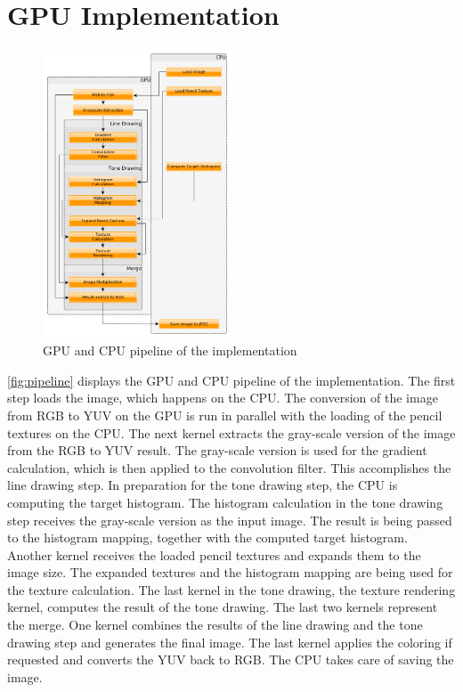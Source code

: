 \section{GPU Implementation} \label{gpu-implementation}

\begin{figure}[htb]
  \centering
  \includegraphics[width=0.5\textwidth]{images/pipeline.png}
  \caption{GPU and CPU pipeline of the implementation}
  \label{fig:pipeline}
\end{figure}

\autoref{fig:pipeline} displays the GPU and CPU pipeline of the implementation.
The first step loads the image, which happens on the CPU.  The conversion of
the image from RGB to YUV on the GPU is run in parallel with the loading of the
pencil textures on the CPU.  The next kernel extracts the gray-scale version of
the image from the RGB to YUV result.  The gray-scale version is used for the
gradient calculation, which is then applied to the convolution filter.  This
accomplishes the line drawing step.  In preparation for the tone drawing step,
the CPU is computing the target histogram.  The histogram calculation in the
tone drawing step receives the gray-scale version as the input image.  The
result is being passed to the histogram mapping, together with the computed
target histogram.  Another kernel receives the loaded pencil textures and
expands them to the image size.  The expanded textures and the histogram
mapping are being used for the texture calculation.  The last kernel in the
tone drawing, the texture rendering kernel, computes the result of the tone
drawing.  The last two kernels represent the merge.  One kernel combines the
results of the line drawing and the tone drawing step and generates the final
image.  The last kernel applies the coloring if requested and converts the YUV
back to RGB.  The CPU takes care of saving the image.

